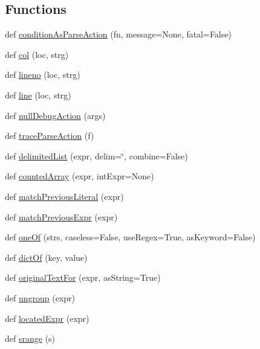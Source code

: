 \subsection*{Functions}
\begin{DoxyCompactItemize}
\item 
def \hyperlink{namespacepyparsing_ade1d8de85fac4306e21a3d31cb366bf3}{condition\+As\+Parse\+Action} (fn, message=None, fatal=False)
\item 
def \hyperlink{namespacepyparsing_af3e07bff69d7504360e58f40a227ff74}{col} (loc, strg)
\item 
def \hyperlink{namespacepyparsing_ab41b88fb8292745d6460e7363ce459d8}{lineno} (loc, strg)
\item 
def \hyperlink{namespacepyparsing_a4b96d613a62571b4c813681f5d785150}{line} (loc, strg)
\item 
def \hyperlink{namespacepyparsing_a07c627d849577b15ab1b5da26df30982}{null\+Debug\+Action} (args)
\item 
def \hyperlink{namespacepyparsing_a90995c5cae27231b18d57f49d55db206}{trace\+Parse\+Action} (f)
\item 
def \hyperlink{namespacepyparsing_a8f460285aae56fa589c97cc6d906321e}{delimited\+List} (expr, delim=\char`\"{},  combine=False)
\item 
def \hyperlink{namespacepyparsing_a9db2989e6618f26af797ca93bd7b5fdd}{counted\+Array} (expr, int\+Expr=None)
\item 
def \hyperlink{namespacepyparsing_a08768339b63e29777dc0a552147ccf30}{match\+Previous\+Literal} (expr)
\item 
def \hyperlink{namespacepyparsing_a3b5fd9941a3576d6b7345bddce6dc0c3}{match\+Previous\+Expr} (expr)
\item 
def \hyperlink{namespacepyparsing_a98720c0a7307da8e72d225755faeea30}{one\+Of} (strs, caseless=False, use\+Regex=True, as\+Keyword=False)
\item 
def \hyperlink{namespacepyparsing_a1ca11345ac006d9374c42fdd3205e0e6}{dict\+Of} (key, value)
\item 
def \hyperlink{namespacepyparsing_ae35d76fb7539167de55fee44a601aabf}{original\+Text\+For} (expr, as\+String=True)
\item 
def \hyperlink{namespacepyparsing_a88118fadaa81fc84f4c5a2c3a9ca4205}{ungroup} (expr)
\item 
def \hyperlink{namespacepyparsing_a745ff2c112643ae0bb8649a56eaf51cf}{located\+Expr} (expr)
\item 
def \hyperlink{namespacepyparsing_a189051e4dd15d661d3e577ef5490d716}{srange} (s)

\end{DoxyCompactItemize}

